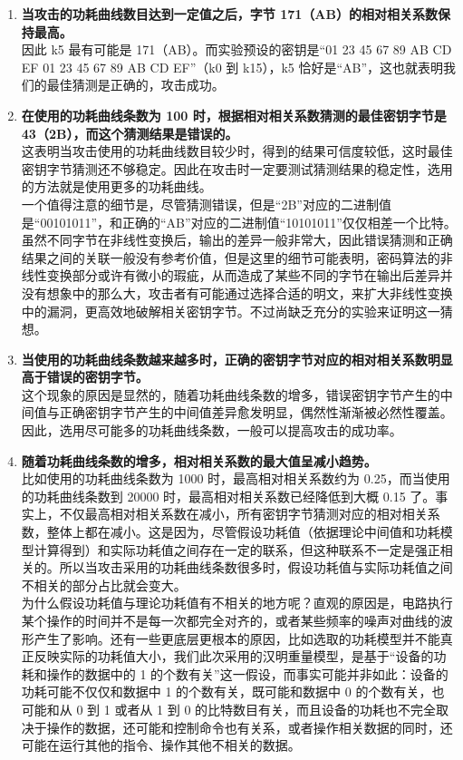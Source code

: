 \begin{enumerate}
    \item \textbf{当攻击的功耗曲线数目达到一定值之后，字节 171（AB）的相对相关系数保持最高。}\\
    因此 k5 最有可能是 171（AB）。而实验预设的密钥是“01 23 45 67 89 AB CD EF 01 23 45 67 89 AB CD EF”（k0 到 k15），k5 恰好是“AB”，这也就表明我们的最佳猜测是正确的，攻击成功。
    \item \textbf{在使用的功耗曲线条数为 100 时，根据相对相关系数猜测的最佳密钥字节是 43（2B），而这个猜测结果是错误的。}\\
    这表明当攻击使用的功耗曲线数目较少时，得到的结果可信度较低，这时最佳密钥字节猜测还不够稳定。因此在攻击时一定要测试猜测结果的稳定性，选用的方法就是使用更多的功耗曲线。\\
    一个值得注意的细节是，尽管猜测错误，但是“2B”对应的二进制值是“00101011”，和正确的“AB”对应的二进制值“10101011”仅仅相差一个比特。虽然不同字节在非线性变换后，输出的差异一般非常大，因此错误猜测和正确结果之间的关联一般没有参考价值，但是这里的细节可能表明，密码算法的非线性变换部分或许有微小的瑕疵，从而造成了某些不同的字节在输出后差异并没有想象中的那么大，攻击者有可能通过选择合适的明文，来扩大非线性变换中的漏洞，更高效地破解相关密钥字节。不过尚缺乏充分的实验来证明这一猜想。
    \item \textbf{当使用的功耗曲线条数越来越多时，正确的密钥字节对应的相对相关系数明显高于错误的密钥字节。}\\
    这个现象的原因是显然的，随着功耗曲线条数的增多，错误密钥字节产生的中间值与正确密钥字节产生的中间值差异愈发明显，偶然性渐渐被必然性覆盖。因此，选用尽可能多的功耗曲线条数，一般可以提高攻击的成功率。
    \item \textbf{随着功耗曲线条数的增多，相对相关系数的最大值呈减小趋势。}\\
    比如使用的功耗曲线条数为 1000 时，最高相对相关系数约为 0.25，而当使用的功耗曲线条数到 20000 时，最高相对相关系数已经降低到大概 0.15 了。事实上，不仅最高相对相关系数在减小，所有密钥字节猜测对应的相对相关系数，整体上都在减小。这是因为，尽管假设功耗值（依据理论中间值和功耗模型计算得到）和实际功耗值之间存在一定的联系，但这种联系不一定是强正相关的。所以当攻击采用的功耗曲线条数很多时，假设功耗值与实际功耗值之间不相关的部分占比就会变大。\\
    为什么假设功耗值与理论功耗值有不相关的地方呢？直观的原因是，电路执行某个操作的时间并不是每一次都完全对齐的，或者某些频率的噪声对曲线的波形产生了影响。还有一些更底层更根本的原因，比如选取的功耗模型并不能真正反映实际的功耗值大小，我们此次采用的汉明重量模型，是基于“设备的功耗和操作的数据中的 1 的个数有关”这一假设，而事实可能并非如此：设备的功耗可能不仅仅和数据中 1 的个数有关，既可能和数据中 0 的个数有关，也可能和从 0 到 1 或者从 1 到 0 的比特数目有关，而且设备的功耗也不完全取决于操作的数据，还可能和控制命令也有关系，或者操作相关数据的同时，还可能在运行其他的指令、操作其他不相关的数据。\\

\end{enumerate}
